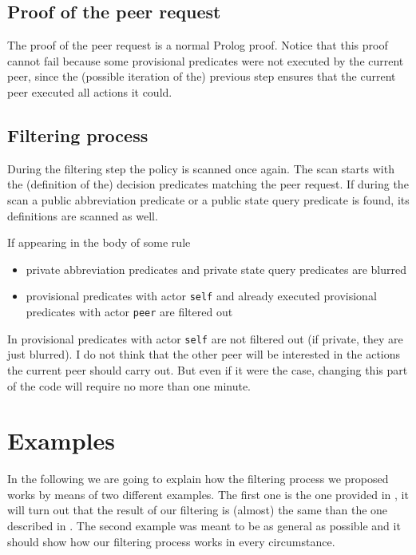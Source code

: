 \documentclass{article}
\begin{document}
\subsection{Proof of the peer request}

The proof of the peer request is a normal Prolog proof. Notice that this proof cannot fail because some provisional predicates were not executed by the current peer, since the (possible iteration of the) previous step ensures that the current peer executed all actions it could.

\subsection{Filtering process}

During the filtering step the policy is scanned once again. The scan starts with the (definition of the) decision predicates matching the peer request. If during the scan a public abbreviation predicate or a public state query predicate is found, its definitions are scanned as well.

If appearing in the body of some rule

\begin{itemize}
	\item private abbreviation predicates and private state query predicates are blurred
	\item provisional predicates with actor \texttt{self} and already executed provisional predicates with actor \texttt{peer} are filtered out
\end{itemize}

\begin{note}
In \cite{Denisa} provisional predicates with actor \texttt{self} are not filtered out (if private, they are just blurred). I do not think that the other peer will be interested in the actions the current peer should carry out. But even if it were the case, changing this part of the code will require no more than one minute.
\end{note}

\section{Examples}

In the following we are going to explain how the filtering process we proposed works by means of two different examples. The first one is the one provided in \cite{Denisa}, it will turn out that the result of our filtering is (almost) the same than the one described in \cite{Denisa}. The second example was meant to be as general as possible and it should show how our filtering process works in every circumstance.
\end{document}
